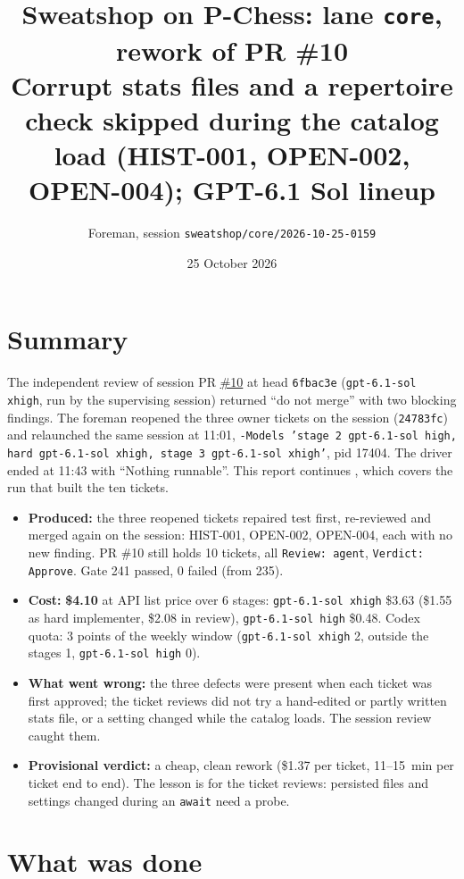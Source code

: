 \documentclass[11pt,a4paper]{article}
\title{Sweatshop on P-Chess: lane \texttt{core}, rework of PR \#10\\\large Corrupt stats files and a repertoire check skipped during the catalog load (HIST-001, OPEN-002, OPEN-004); GPT-6.1 Sol lineup}
\author{Foreman, session \texttt{sweatshop/core/2026-10-25-0159}}
\date{25 October 2026}
\begin{document}
\maketitle

\section*{Summary}

The independent review of session PR \href{https://github.com/Laginho/P-Chess/pull/10}{\#10} at
head \texttt{6fbac3e} (\texttt{gpt-6.1-sol xhigh}, run by the supervising session) returned
``do not merge'' with two blocking findings. The foreman reopened the three owner tickets on
the session (\texttt{24783fc}) and relaunched the same session at 11:01, \texttt{-Models 'stage
2 gpt-6.1-sol high, hard gpt-6.1-sol xhigh, stage 3 gpt-6.1-sol xhigh'}, pid 17404. The driver
ended at 11:43 with ``Nothing runnable''. This report continues
, which covers the run that built the ten tickets.

\begin{itemize}
  \item \textbf{Produced:} the three reopened tickets repaired test first, re-reviewed and
        merged again on the session: HIST-001, OPEN-002, OPEN-004, each with no new finding.
        PR \#10 still holds 10 tickets, all \texttt{Review: agent}, \texttt{Verdict: Approve}.
        Gate 241 passed, 0 failed (from 235).
  \item \textbf{Cost:} \textbf{\$4.10} at API list price over 6 stages:
        \texttt{gpt-6.1-sol xhigh} \$3.63 (\$1.55 as hard implementer, \$2.08 in review),
        \texttt{gpt-6.1-sol high} \$0.48. Codex quota: 3 points of the weekly window
        (\texttt{gpt-6.1-sol xhigh} 2, outside the stages 1, \texttt{gpt-6.1-sol high} 0).
  \item \textbf{What went wrong:} the three defects were present when each ticket was first
        approved; the ticket reviews did not try a hand-edited or partly written stats file,
        or a setting changed while the catalog loads. The session review caught them.
  \item \textbf{Provisional verdict:} a cheap, clean rework (\$1.37 per ticket, 11--15~min per
        ticket end to end). The lesson is for the ticket reviews: persisted files and
        settings changed during an \texttt{await} need a probe.
\end{itemize}

\section*{What was done}
\end{document}
